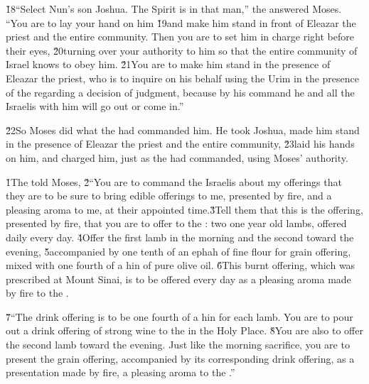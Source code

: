 \v{18}``Select Nun's son Joshua. The Spirit is in that man,'' the  answered Moses. ``You are to lay your hand on him \v{19}and make him stand in front of Eleazar the priest and the entire community. Then you are to set him in charge right before their eyes, \v{20}turning over your authority to him so that the entire community of Israel knows to obey him. \v{21}You are to make him stand in the presence of Eleazar the priest, who is to inquire on his behalf using the Urim in the presence of the  regarding a decision of judgment, because by his command he and all the Israelis with him will go out or come in.''

\v{22}So Moses did what the  had commanded him. He took Joshua, made him stand in the presence of Eleazar the priest and the entire community, \v{23}laid his hands on him, and charged him, just as the  had commanded, using Moses' authority.

\v{1}The  told Moses, \v{2}``You are to command the Israelis about my offerings that they are to be sure to bring edible offerings to me, presented by fire, and a pleasing aroma to me, at their appointed time.\v{3}Tell them that this is the offering, presented by fire, that you are to offer to the : two one year old lambs, offered daily every day. \v{4}Offer the first lamb in the morning and the second toward the evening, \v{5}accompanied by one tenth of an ephah of fine flour for grain offering, mixed with one fourth of a hin of pure olive oil. \v{6}This burnt offering, which was prescribed at Mount Sinai, is to be offered every day as a pleasing aroma made by fire to the .

\v{7}``The drink offering is to be one fourth of a hin for each lamb. You are to pour out a drink offering of strong wine to the  in the Holy Place. \v{8}You are also to offer the second lamb toward the evening. Just like the morning sacrifice, you are to present the grain offering, accompanied by its corresponding drink offering, as a presentation made by fire, a pleasing aroma to the .''

